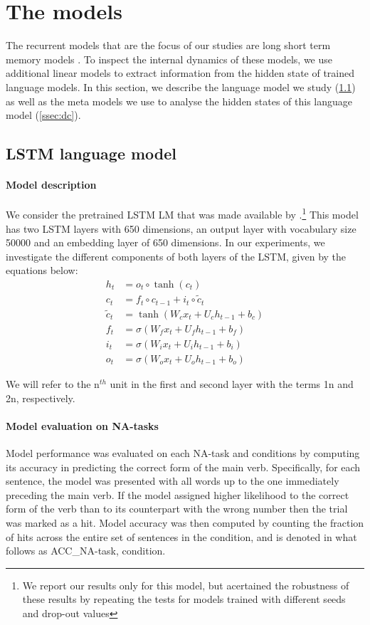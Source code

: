 
\section{The models}

The recurrent models that are the focus of our studies are long short term memory models \cite[LSTMs]{Hochreiter:Schmidhuber:1997}.
To inspect the internal dynamics of these models, we use additional linear models to extract information from the hidden state of trained language models.
In this section, we describe the language model we study (\ref{ssec:lstm_lm}) as well as the meta models we use to analyse the hidden states of this language model (\ref{ssec:dc}).

\subsection{LSTM language model}\label{ssec:lstm_lm}

\paragraph{Model description} We consider the pretrained LSTM LM that was made available by \cite{Gulordava:etal:2018}.\footnote{We report our results only for this model, but acertained the robustness of these results by repeating the tests for models trained with different seeds and drop-out values}
This model has two LSTM layers with 650 dimensions, an output layer with vocabulary size 50000 and an embedding layer of 650 dimensions.
In our experiments, we investigate the different components of both layers of the LSTM, given by the equations below:
\begin{align}
    h_t & = o_t\circ \tanh(c_t)\\ 
     c_t & = f_t\circ c_{t-1} + i_t\circ \widetilde{c}_t\\
     \widetilde{c}_t & = \tanh(W_cx_t + U_ch_{t-1} + b_c)\\
     f_t & = \sigma(W_fx_t + U_fh_{t-1} + b_f) \\
     i_t & = \sigma(W_ix_t + U_ih_{t-1} + b_i) \\
     o_t & = \sigma(W_ox_t + U_oh_{t-1} + b_o)
\end{align}

We will refer to the n$^{th}$ unit in the first and second layer with the terms \unit{1}{n} and \unit{2}{n}, respectively.

\paragraph{Model evaluation on NA-tasks}
Model performance was evaluated on each NA-task and conditions by computing its accuracy in predicting the correct form of the main verb. Specifically, for each sentence, the model was presented with all words up to the one immediately preceding the main verb. If the model assigned higher likelihood to the correct form of the verb than to its counterpart with the wrong number then the trial was marked as a hit. Model accuracy was then computed by counting the fraction of hits across the entire set of sentences in the condition, and is denoted in what follows as ACC_{NA-task, condition}.


